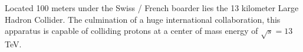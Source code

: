 Located 100 meters under the Swiss / French boarder lies the 13 kilometer
Large Hadron Collider.  The culmination of a huge international collaboration,
this apparatus is capable of colliding protons at a center of mass energy of
$\sqrt{s} = 13$ TeV.

